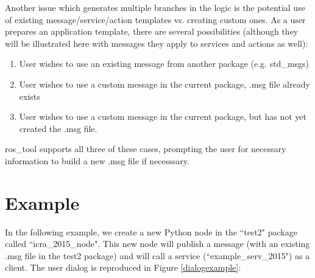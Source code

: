 \documentclass[letterpaper, 10 pt, conference]{ieeeconf}  %
\begin{document}
Another issue which generates multiple branches in the logic is the potential use of existing message/service/action templates vs. creating custom ones.  As a user prepares an application template, there are several possibilities (although they will be illustrated here with messages they apply to services and actions as well):
\begin{enumerate}
  \item User wishes to use an existing message from another package (e.g. std\_msgs)
  \item User wishes to use a custom message in the current package, .msg file already exists
  \item User wishes to use a custom message in the current package, but has not yet created the .msg file.
\end{enumerate}
ros\_tool supports all three of these cases, prompting the user for necessary information to build a new .msg file if necesssary. 

\section{Example}
In the following example, we create a new Python node in the ``test2" package called ``icra\_2015\_node".  This new node will publish a message (with an existing .msg file in the test2 package) and will call a service (``example\_serv\_2015") as a client.   The user dialog is reproduced in Figure \ref{dialogexample}:
\end{document}
